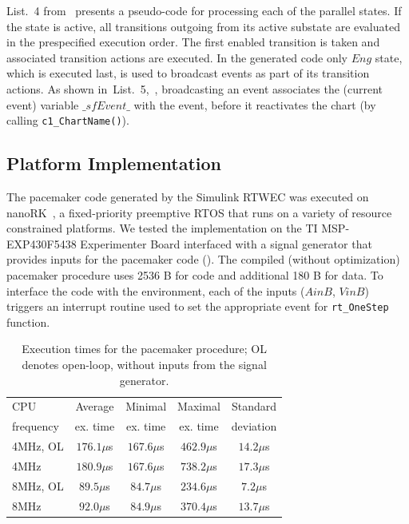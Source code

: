 List.~4 from~ presents a pseudo-code for processing each of the parallel states. If the state is active, all transitions outgoing from its active substate are evaluated in the prespecified execution order. The first enabled transition is taken and associated transition actions are executed. In the generated code only $Eng$ state, which is executed last, is used to broadcast events as part of its transition actions. As shown in~List.~5,~, broadcasting an event associates the (current event) variable $\_sfEvent\_$ with the event, before it reactivates the chart (by calling \texttt{c1\_ChartName()}). 



\subsection{Platform Implementation}
\label{sec:impl}
The pacemaker code generated by the Simulink RTWEC was executed on nanoRK~\cite{nanork}, a fixed-priority preemptive RTOS that runs on a variety of resource constrained platforms. We tested the implementation on the TI MSP-EXP430F5438 Experimenter Board interfaced with a signal generator that provides inputs for the pacemaker code (). The compiled (without optimization) pacemaker procedure uses 2536 B for code and additional 180 B for data. To interface the code with the environment, each of the inputs ($AinB$, $VinB$) triggers an interrupt routine used to set the appropriate event for \texttt{rt\_OneStep} function.

\begin{table}[!b]

{
\begin{tabular}{|l|c|c|c|c|}
\hline
CPU & Average & Minimal & Maximal & Standard \\ 
frequency & ex. time & ex. time & ex. time & deviation \\\hline
4MHz, OL	& $176.1\mu$s & $167.6\mu$s & $462.9\mu$s & $14.2\mu$s \\\hline
4MHz			& $180.9\mu$s & $167.6\mu$s & $738.2\mu$s & $17.3\mu$s \\\hline		
8MHz, OL	& $89.5\mu$s & $84.7\mu$s & $234.6\mu$s & $7.2\mu$s \\\hline
8MHz			& $92.0\mu$s & $84.9\mu$s & $370.4\mu$s & $13.7\mu$s \\\hline
\end{tabular}
}
\caption{Execution times for the pacemaker procedure; OL denotes open-loop, without inputs from the signal generator.}
\label{tab:MSP430exec_time}

\end{table}


